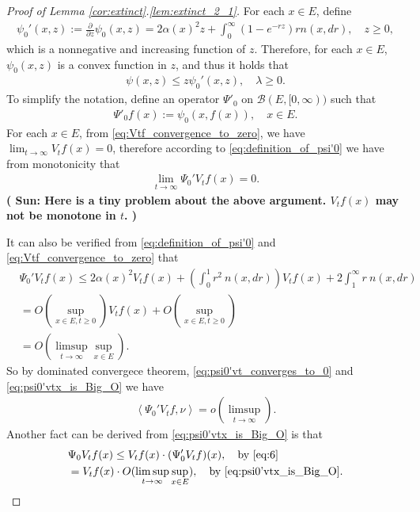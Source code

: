 \documentclass[12pt,a4paper]{amsart}
\numberwithin{equation}{section}
\theoremstyle{plain}
\theoremstyle{definition}
\begin{document}
\begin{proof}[Proof of Lemma \ref{cor:extinct}.\eqref{lem:extinct_2_1}]

For each $x\in E$, define 
\begin{align}
\label{eq:definition_of_psi'0}
 \psi_0'(x,z):=\frac{\partial}{\partial z}\psi_0(x,z)
    =2\alpha(x)^2 z + \int_0^{\infty}\left(1-e^{-r z}\right)rn(x,dr), 
    \quad z \geq 0,
\end{align}
which is a nonnegative and increasing function of $z$. 
Therefore, for each $x\in E$, $\psi_0(x,z)$ is a convex function in $z$, and thus it holds that
\begin{align}
\psi(x,z) \leq z \psi_0'(x,z),
\quad \lambda \geq 0.
\label{eq:6}
\end{align}
To simplify the notation, define an operator $\Psi'_0$ on $\mathcal B(E,[0,\infty))$ such that
\begin{align}
\Psi'_0 f(x) := \psi_0(x,f(x)), \quad x\in E.
\end{align}
For each $x\in E$, from \eqref{eq:Vtf_convergence_to_zero}, we have $\lim_{t\to \infty} V_tf(x) = 0$, therefore according to \eqref{eq:definition_of_psi'0} we have from monotonicity that 
\begin{align}
\label{eq:psi0'vt_converges_to_0}
\lim_{t\to \infty}\Psi_0' V_tf(x) = 0.
\end{align}
{\bf ( Sun: Here is a tiny problem about the above argument. $V_t f(x)$ may not be monotone in $t$. )}

It can also be verified from \eqref{eq:definition_of_psi'0} and \eqref{eq:Vtf_convergence_to_zero} that
\begin{align}
&\Psi_0'V_tf(x) \leq 2\alpha(x)^2 V_tf(x)+ \left(\int_0^1 r^2~n(x, dr)\right) V_tf(x) + 2 \int_1^\infty r~n(x,dr)
\\&= O(\sup_{x\in E,t\geq 0})V_tf(x)+ O(\sup_{x\in E,t\geq 0})
\\&=  O(\limsup_{t\to \infty} \sup_{x\in E}). \label{eq:psi0'vtx_is_Big_O}
\end{align}
So by dominated convergece theorem, \eqref{eq:psi0'vt_converges_to_0} and \eqref{eq:psi0'vtx_is_Big_O} we have
\begin{align}
\label{eq:Psi0'Vtfnu_is_smallo}
\left\langle \Psi_0' V_tf, \nu \right\rangle = o(\limsup_{t\to \infty}).
\end{align}
Another fact can be derived from \eqref{eq:psi0'vtx_is_Big_O} is that
\begin{align}
&\Psi_0 V_tf(x) 
\leq V_tf(x) \cdot (\Psi'_0 V_tf)(x) ,\quad\text{by~\eqref{eq:6}}
  \\&= V_tf(x)\cdot O(\limsup_{t\to \infty} \sup_{x\in E}),\quad\text{by~\eqref{eq:psi0'vtx_is_Big_O}}.\label{eq:Psi0_Vtf_leq_Vtf}
\end{align}


\end{proof}
\end{document}

